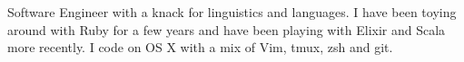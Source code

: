 

\begin{cvparagraph}

Software Engineer with a knack for linguistics and languages. I have been
toying around with Ruby for a few years and have been playing with Elixir and
Scala more recently. I code on OS X with a mix of Vim, tmux, zsh and git.
\end{cvparagraph}
